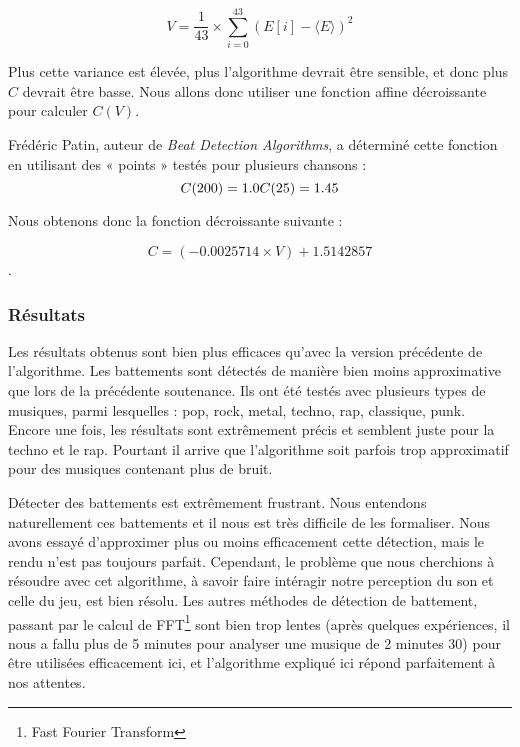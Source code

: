 $$V = \frac{1}{43} \times \sum_{i=0}^{43} (E[i] - \langle E \rangle)^2$$

\par Plus cette variance est élevée, plus l'algorithme devrait être sensible, et donc plus $C$ devrait être basse.
Nous allons donc utiliser une fonction affine décroissante pour calculer $C(V)$.

\par Frédéric Patin, auteur de \emph{Beat Detection Algorithms}, a déterminé cette fonction en utilisant des « points » testés pour plusieurs chansons :
$$
C(200) = 1.0\\
C(25) = 1.45\\
$$

\par Nous obtenons donc la fonction décroissante suivante :

$$C = (-0.0025714 \times V) + 1.5142857$$.

\subsubsection{Résultats}
\par Les résultats obtenus sont bien plus efficaces qu'avec la version précédente de l'algorithme. Les battements sont détectés de manière
bien moins approximative que lors de la précédente soutenance. Ils ont été testés avec plusieurs types de musiques,
parmi lesquelles : pop, rock, metal, techno, rap, classique, punk. Encore une fois, les résultats sont extrêmement précis et
semblent juste pour la techno et le rap. Pourtant il arrive que l'algorithme soit parfois trop approximatif pour des musiques
contenant plus de bruit.

\par Détecter des battements est extrêmement frustrant. Nous entendons naturellement ces battements et il nous est très difficile
de les formaliser. Nous avons essayé d'approximer plus ou moins efficacement cette détection, mais le rendu n'est pas
toujours parfait. Cependant, le problème que nous cherchions à résoudre avec cet algorithme, à savoir faire intéragir notre perception
du son et celle du jeu, est bien résolu. Les autres méthodes de détection de battement,
passant par le calcul de FFT\footnote{Fast Fourier Transform} sont bien trop lentes (après quelques expériences, il nous a 
fallu plus de 5 minutes pour analyser une musique de 2 minutes 30) pour être utilisées efficacement ici, et l'algorithme expliqué ici
répond parfaitement à nos attentes.

